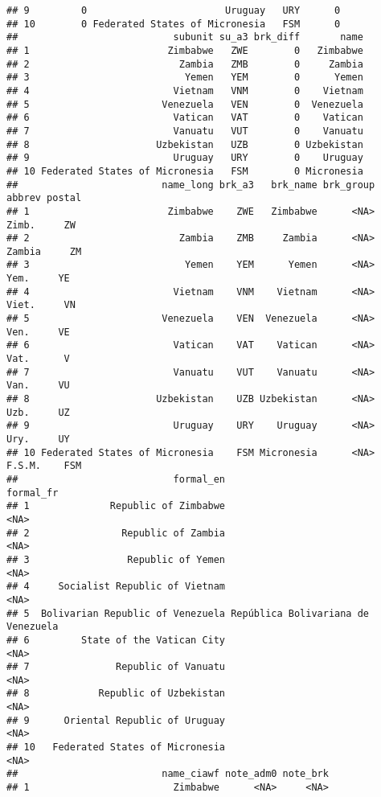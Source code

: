 \documentclass[
]{article}
\begin{document}
\begin{verbatim}
## 9         0                        Uruguay   URY      0
## 10        0 Federated States of Micronesia   FSM      0
##                           subunit su_a3 brk_diff       name
## 1                        Zimbabwe   ZWE        0   Zimbabwe
## 2                          Zambia   ZMB        0     Zambia
## 3                           Yemen   YEM        0      Yemen
## 4                         Vietnam   VNM        0    Vietnam
## 5                       Venezuela   VEN        0  Venezuela
## 6                         Vatican   VAT        0    Vatican
## 7                         Vanuatu   VUT        0    Vanuatu
## 8                      Uzbekistan   UZB        0 Uzbekistan
## 9                         Uruguay   URY        0    Uruguay
## 10 Federated States of Micronesia   FSM        0 Micronesia
##                         name_long brk_a3   brk_name brk_group abbrev postal
## 1                        Zimbabwe    ZWE   Zimbabwe      <NA>  Zimb.     ZW
## 2                          Zambia    ZMB     Zambia      <NA> Zambia     ZM
## 3                           Yemen    YEM      Yemen      <NA>   Yem.     YE
## 4                         Vietnam    VNM    Vietnam      <NA>  Viet.     VN
## 5                       Venezuela    VEN  Venezuela      <NA>   Ven.     VE
## 6                         Vatican    VAT    Vatican      <NA>   Vat.      V
## 7                         Vanuatu    VUT    Vanuatu      <NA>   Van.     VU
## 8                      Uzbekistan    UZB Uzbekistan      <NA>   Uzb.     UZ
## 9                         Uruguay    URY    Uruguay      <NA>   Ury.     UY
## 10 Federated States of Micronesia    FSM Micronesia      <NA> F.S.M.    FSM
##                           formal_en                          formal_fr
## 1              Republic of Zimbabwe                               <NA>
## 2                Republic of Zambia                               <NA>
## 3                 Republic of Yemen                               <NA>
## 4     Socialist Republic of Vietnam                               <NA>
## 5  Bolivarian Republic of Venezuela República Bolivariana de Venezuela
## 6         State of the Vatican City                               <NA>
## 7               Republic of Vanuatu                               <NA>
## 8            Republic of Uzbekistan                               <NA>
## 9      Oriental Republic of Uruguay                               <NA>
## 10   Federated States of Micronesia                               <NA>
##                         name_ciawf note_adm0 note_brk
## 1                         Zimbabwe      <NA>     <NA>

\end{verbatim}
\end{document}
